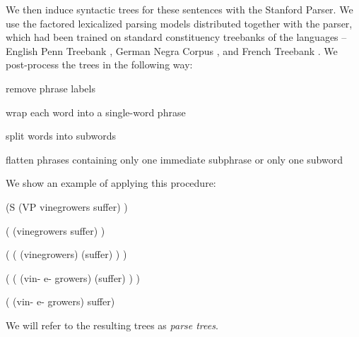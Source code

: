 \documentclass[11pt,a4paper]{article}
\def\RR#1{{\color{blue}RR: \it #1}}
\def\DM#1{{\color{red}DM: \it #1}}
\def\RR#1{}
\def\DM#1{}
\begin{document}
We then induce 
syntactic trees for these sentences
with the Stanford Parser.
We use the factored lexicalized parsing models distributed together with the parser, which had been trained on standard constituency treebanks of the languages --
English Penn Treebank \citep{penntb},
German Negra Corpus \citep{negra},
and French Treebank \citep{ftb}.
We post-process the trees in the following way:
\begin{compactenum}
\item remove phrase labels
\item wrap each word into a single-word phrase
\item split words into subwords
\item flatten phrases containing only one immediate subphrase or only one subword
\end{compactenum}
We show an example of applying this procedure:
\begin{compactenum}
\setcounter{enumi}{-1}
\item (S (VP vinegrowers suffer) )
\item ( (vinegrowers suffer) )
\item ( ( (vinegrowers) (suffer) ) )
\item ( ( (vin- e- growers) (suffer) ) )
\item ( (vin- e- growers) suffer)
\end{compactenum}
We will refer to the resulting trees as \emph{parse trees}.

\RR{Ta ukázka neni moc hezky formátovaná. Ale myslim si že je vhodný ji tu mít.}
\end{document}
